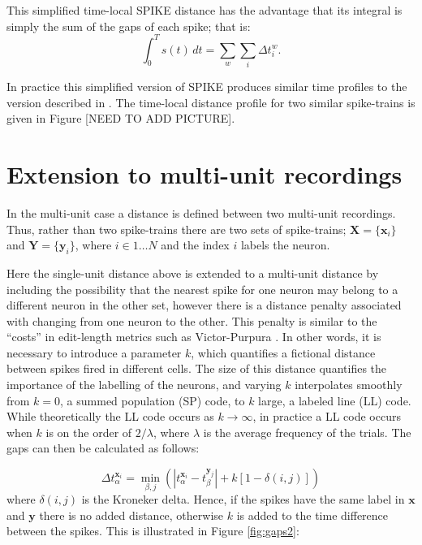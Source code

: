 This simplified time-local SPIKE distance has the advantage that its integral is simply the sum of the gaps of each spike; that is:
\begin{equation}
\int_0^T s(t)\, dt = \sum_w \sum_i \Delta t_i^w.
\end{equation}

In practice this simplified version of SPIKE produces similar time profiles to the version described in \cite{KreuzEtAl2011a}. The time-local distance profile for two similar spike-trains is given in Figure [NEED TO ADD PICTURE].

\section{Extension to multi-unit recordings}

In the multi-unit case a distance is defined between two multi-unit recordings.  Thus, rather than two spike-trains there are two sets of spike-trains; $\mathbf{X}=\{ \mathbf{x}_i \}$ and $ \mathbf{Y}=\{ \mathbf{y}_i \}$, where $i \in 1\ldots N$ and the index $i$ labels the neuron.

Here the single-unit distance above is extended to a multi-unit distance by including the possibility that the nearest spike for one neuron may belong to a different neuron in the other set, however there is a distance penalty associated with changing from one neuron to the other. This penalty is similar to the ``costs'' in edit-length metrics such as Victor-Purpura \cite{VictorPurpura1997}. In other words, it is necessary to introduce a parameter $k$, which quantifies a fictional distance between spikes fired in different cells.  The size of this distance quantifies the importance of the labelling of the neurons, and varying $k$ interpolates smoothly from $k=0$, a summed population (SP) code, to $k$ large, a labeled line  (LL) code.  While theoretically the LL code occurs as $k \rightarrow \infty$, in practice a LL code occurs when $k$ is on the order of $2/\lambda$, where $\lambda$ is the average frequency of the trials.   The gaps can then be calculated as follows:

\begin{equation}
\Delta t_{\alpha}^{\mathbf{x}_i} = \min_{\beta,j} \left( |t_{\alpha}^{\mathbf{x}_i} - t_{\beta}^{\mathbf{y}_j} | + k\left[1-\delta(i,j)\right] \right)
\end{equation}
where $\delta(i,j)$ is the Kroneker delta. Hence, if the spikes have the same label in $\mathbf{x}$ and $\mathbf{y}$ there is no added distance, otherwise $k$ is added to the time difference between the spikes.  This is illustrated in Figure \ref{fig:gaps2}:

